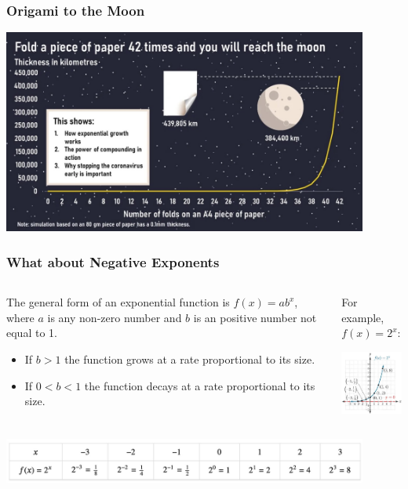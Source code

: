 \documentclass{beamer}
\begin{document}
\begin{frame}\frametitle{Origami to the Moon}
\begin{center}
\includegraphics[width=12cm]{fig/40fold.jpg}
\end{center}
\end{frame}

\begin{frame}\frametitle{What about Negative Exponents}
\begin{columns}
\begin{column}{7cm}
The general form of an exponential function is $f(x) = ab^x$, where $a$ is any non-zero number and $b$ is an positive number not equal to 1.

\begin{itemize}
\item If $b > 1$ the function grows at a rate proportional to its size.
\item If $0 < b < 1$ the function decays at a rate proportional to its size.
\end{itemize}
\end{column}

\begin{column}{5cm}
For example, $f(x) = 2^x$:
\begin{center}
\includegraphics[width=4cm]{fig/exp2g.jpg}
\end{center}
\end{column}
\end{columns}

\begin{center}
\includegraphics[width=12cm]{fig/exp2t.jpg}
\end{center}
\end{frame}
\end{document}

